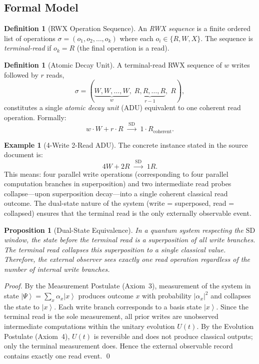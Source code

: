 \documentclass[12pt, a4paper]{article}
\theoremstyle{plain}
\newtheorem{proposition}[theorem]{Proposition}
\theoremstyle{definition}
\newtheorem{definition}[theorem]{Definition}
\newtheorem{example}[theorem]{Example}
\theoremstyle{remark}
\newcommand{\ket}[1]{\left| #1 \right\rangle}
\newcommand{\SD}{\ensuremath{\mathrm{SD}}}   %
\begin{document}
\subsection{Formal Model}

\begin{definition}[RWX Operation Sequence]
  An \emph{RWX sequence} is a finite ordered list of operations
  $\sigma = (o_1, o_2, \ldots, o_k)$ where each $o_i \in \{R, W, X\}$.
  The sequence is \emph{terminal-read} if $o_k = R$ (the final operation is
  a read).
\end{definition}

\begin{definition}[Atomic Decay Unit]
  \label{def:adu}
  A terminal-read RWX sequence of $w$ writes followed by $r$ reads,
  \[
    \sigma = (\underbrace{W, W, \ldots, W}_{w},\;
              \underbrace{R, R, \ldots, R}_{r-1},\; R),
  \]
  constitutes a single \emph{atomic decay unit} (ADU) equivalent to one
  coherent read operation.  Formally:
  \[
    w \cdot W + r \cdot R \;\xrightarrow{\;\SD\;}\; 1 \cdot R_{\text{coherent}}.
  \]
\end{definition}

\begin{example}[4-Write 2-Read ADU]
  The concrete instance stated in the source document is:
  \[
    4W + 2R \;\xrightarrow{\;\SD\;}\; 1R.
  \]
  This means: four parallel write operations (corresponding to four parallel
  computation branches in superposition) and two intermediate read probes
  collapse---upon superposition decay---into a single coherent classical read
  outcome.  The dual-state nature of the system (write = superposed,
  read = collapsed) ensures that the terminal read is the only externally
  observable event.
\end{example}

\begin{proposition}[Dual-State Equivalence]
  In a quantum system respecting the \SD{} window, the state before the
  terminal read is a superposition of all write branches.  The terminal read
  collapses this superposition to a single classical value.  Therefore, the
  external observer sees exactly one read operation regardless of the number
  of internal write branches.
\end{proposition}

\begin{proof}
  By the Measurement Postulate (Axiom~3), measurement of the system in state
  $\ket{\Psi} = \sum_x \alpha_x \ket{x}$ produces outcome $x$ with
  probability $|\alpha_x|^2$ and collapses the state to $\ket{x}$.  Each
  write branch corresponds to a basis state $\ket{x}$.  Since the terminal
  read is the sole measurement, all prior writes are unobserved intermediate
  computations within the unitary evolution $U(t)$.  By the Evolution
  Postulate (Axiom~4), $U(t)$ is reversible and does not produce classical
  outputs; only the terminal measurement does.  Hence the external observable
  record contains exactly one read event. \qed
\end{proof}
\end{document}
